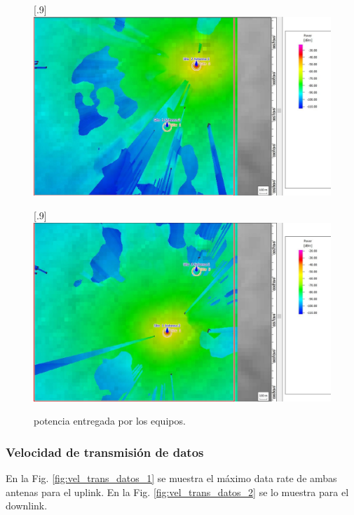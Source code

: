 \documentclass[11pt,a4paper]{article}
\begin{document}
\begin{figure}[ht!]
  \centering
  [.9\linewidth]{\includegraphics[height=14\baselineskip]{fotos_ema/pot_trans_eq_1.jpg}}

  [.9\linewidth]{\includegraphics[height=14\baselineskip]{fotos_ema/pot_trans_eq_2.jpg}}
  \caption{potencia entregada por los equipos.}
  \label{fig:pot_eq_24_GHz}
\end{figure}


\subsubsection{Velocidad de transmisión de datos}

En la Fig. \ref{fig:vel_trans_datos_1} se muestra el máximo data rate de ambas antenas para el uplink. En la Fig. \ref{fig:vel_trans_datos_2} se lo muestra para el downlink.
\end{document}
